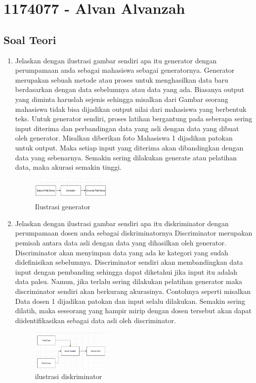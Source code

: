 \section{1174077 - Alvan Alvanzah}
\subsection{Soal Teori}
\begin{enumerate}

	\item Jelaskan dengan ilustrasi gambar sendiri apa itu generator dengan perumpamaan anda sebagai mahasiswa sebagai generatornya.
	\hfill\break
    Generator merupakan sebuah metode atau proses untuk menghasilkan data baru berdasarkan dengan data sebelumnya atau data yang ada. Biasanya output yang diminta haruslah sejenis sehingga misalkan dari Gambar seorang mahasiswa tidak bisa dijadikan output nilai dari mahasiswa yang berbentuk teks. Untuk generator sendiri, proses latihan bergantung pada seberapa sering input diterima dan perbandingan data yang asli dengan data yang dibuat oleh generator. Misalkan diberikan foto Mahasiswa 1 dijadikan patokan untuk output. Maka setiap input yang diterima akan dibandingkan dengan data yang sebenarnya. Semakin sering dilakukan generate atau pelatihan data, maka akurasi semakin tinggi.
    \hfill \break
    \begin{figure}[H]
	\centering
		\includegraphics[width=4cm]{figures/1174077/8/t1.PNG}
		\caption{Ilustrasi generator}
	\end{figure}

	\item Jelaskan dengan ilustrasi gambar sendiri apa itu diskriminator dengan perumpamaan dosen anda sebagai diskriminatornya
    \hfill\break
    Discriminator merupakan pemisah antara data asli dengan data yang dihasilkan oleh generator. Discriminator akan menyimpan data yang ada ke kategori yang sudah dideﬁnisikan sebelumnya. Discriminator sendiri akan membandingkan data input dengan pembanding sehingga dapat diketahui jika input itu adalah data palsu. Namun, jika terlalu sering dilakukan pelatihan generator maka discriminator sendiri akan berkurang akurasinya. Contohnya seperti misalkan Data dosen 1 dijadikan patokan dan input selalu dilakukan. Semakin sering dilatih, maka seseorang yang hampir mirip dengan dosen tersebut akan dapat diidentiﬁkasikan sebagai data asli oleh discriminator.
    \begin{figure}[H]
	\centering
		\includegraphics[width=4cm]{figures/1174077/8/t2.PNG}
		\caption{ilustrasi diskriminator}
	\end{figure}


\end{enumerate}
